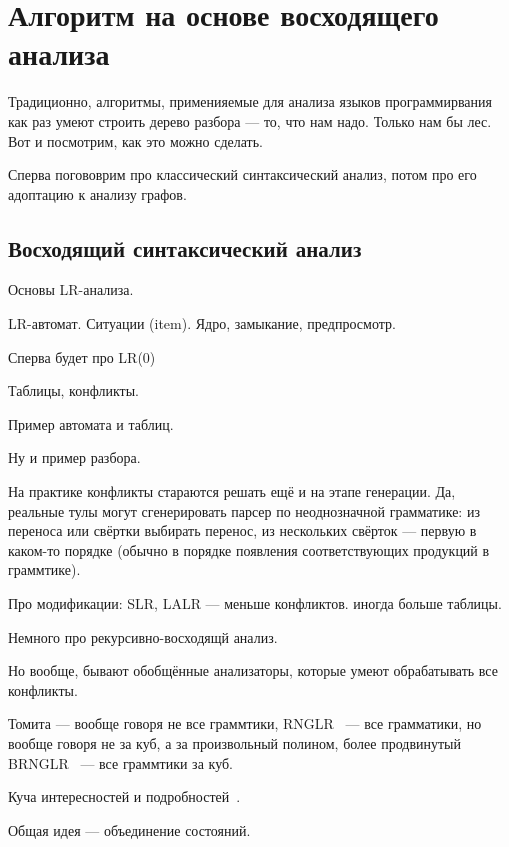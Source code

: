 \section{Алгоритм на основе восходящего анализа}

Традиционно, алгоритмы, применияемые для анализа языков программирвания как раз умеют строить дерево разбора --- то, что нам надо.
Только нам бы лес.
Вот и посмотрим, как это можно сделать.

Сперва погововрим про классический синтаксический анализ, потом про его адоптацию к анализу графов.

\subsection{Восходящий синтаксический анализ}

Основы LR-анализа.

LR-автомат. Ситуации (item).
Ядро, замыкание, предпросмотр.

Сперва будет про LR(0)

Таблицы, конфликты.

\begin{example}
Пример автомата и таблиц.
\end{example}

\begin{example}
Ну и пример разбора.
\end{example}


На практике конфликты стараются решать ещё и на этапе генерации.
Да, реальные тулы могут сгенерировать парсер по неоднозначной грамматике: из переноса или свёртки выбирать перенос, из нескольких свёрток --- первую в каком-то порядке (обычно в порядке появления соответствующих продукций в граммтике).

Про модификации: SLR, LALR --- меньше конфликтов. иногда больше таблицы.

Немного про рекурсивно-восходящй анализ.

Но вообще, бывают обобщённые анализаторы, которые умеют обрабатывать все конфликты.

Томита --- вообще говоря не все граммтики, RNGLR~\cite{Scott:2006:RNG:1146809.1146810} --- все грамматики, но вообще говоря не за куб, а за произвольный полином, более продвинутый BRNGLR~\cite{!!!} --- все граммтики за куб.

Куча интересностей и подробностей~\cite{DBLP:phd/ethos/Economopoulos06}.

Общая идея --- объединение состояний. 

